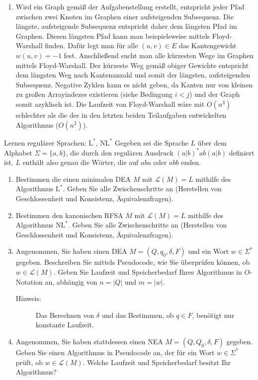 \documentclass[11pt,a4paper]{article}
\begin{document}
\begin{loesung}
\begin{enumerate}
        \item Wird ein Graph gemäß der Aufgabenstellung erstellt, entspricht jeder Pfad zwischen zwei Knoten im Graphen einer aufsteigenden Subsequenz.
        Die längste, aufsteigende Subsequenz entspricht daher dem längsten Pfad im Graphen.
        Diesen längsten Pfad kann man beispielsweise mittels Floyd-Warshall finden.
        Dafür legt man für alle $(u, v) \in E$ das Kantengewicht $w(u, v) = -1$ fest.
        Anschließend sucht man alle kürzesten Wege im Graphen mittels Floyd-Warshall. Der kürzeste Weg gemäß obiger Gewichte entspricht dem längsten Weg nach Kantenanzahl und somit der längsten, aufsteigenden Subsequenz.
        Negative Zyklen kann es nicht geben, da Kanten nur von kleinen zu großen Arrayindezes existieren (siehe Bedingung $i < j$) und der Graph somit azyklisch ist.
        Die Laufzeit von Floyd-Warshall wäre mit $O(n^3)$ schlechter als die des in den letzten beiden Teilaufgaben entwickelten Algorithmus ($O(n^2)$).
    \end{enumerate}
\end{loesung}

\begin{aufgabe}{4}{Lernen regulärer Sprachen: $\mathrm{L}^*$, $\mathrm{NL}^*$}
    Gegeben sei die Sprache $L$ über dem Alphabet $\Sigma = \{a, b\}$, die durch den regulären Ausdruck $(a|b)^*ab(a|b)$ definiert ist. $L$ enthält also genau die Wörter, die auf $aba$ oder $abb$ enden.
    \begin{enumerate}
        \item Bestimmen die einen minimalen DEA $M$ mit $\mathcal{L}(M) = L$ mithilfe des Algorithmus $\mathrm{L}^*$. Geben Sie alle Zwischenschritte an (Herstellen von Geschlossenheit und Konsistenz, Äquivalenzfragen).
        \item Bestimmen den kanonischen RFSA $M$ mit $\mathcal{L}(M) = L$ mithilfe des Algorithmus $\mathrm{NL}^*$. Geben Sie alle Zwischenschritte an (Herstellen von Geschlossenheit und Konsistenz, Äquivalenzfragen).
        \item Angenommen, Sie haben einen DEA $M = (Q, q_0, \delta, F)$ und ein Wort $w \in \Sigma^*$ gegeben.
        Beschreiben Sie mittels Pseudocode, wie Sie überprüfen können, ob $w \in \mathcal{L}(M)$. Geben Sie Laufzeit und Speicherbedarf Ihres Algorithmus in $O$-Notation an, abhängig von $n = |Q|$ und $m = |w|$.
        \begin{description}
            \item[Hinweis:] Das Berechnen von $\delta$ und das Bestimmen, ob $q \in F$, benötigt nur konstante Laufzeit.
        \end{description}
        \item Angenommen, Sie haben stattdessen einen NEA $M = (Q, Q_0, \delta, F)$ gegeben.
        Geben Sie einen Algorithmus in Pseudocode an, der für ein Wort $w \in \Sigma^*$ prüft, ob $w \in \mathcal{L}(M)$.
        Welche Laufzeit und Speicherbedarf besitzt Ihr Algorithmus?
    \end{enumerate}
\end{aufgabe}
\end{document}
